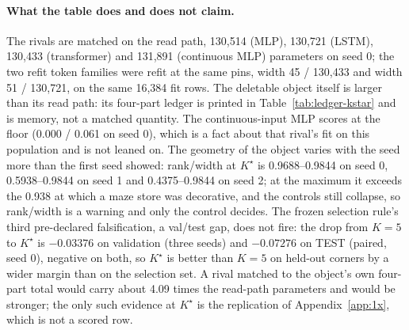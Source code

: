 \documentclass{article} %
\newcommand{\Kstar}{\ensuremath{K^{\star}}}
\begin{document}
\paragraph{What the table does and does not claim.} The rivals are matched on the read path,
130,514 (MLP), 130,721 (LSTM), 130,433 (transformer) and 131,891 (continuous MLP) parameters
on seed 0; the two refit token families were refit at the same pins, width 45 / 130,433 and
width 51 / 130,721, on the same 16,384 fit rows. %
The deletable object itself is larger than its read path: its four-part ledger is printed in
Table~\ref{tab:ledger-kstar} and is memory, not a matched quantity. The continuous-input MLP
scores at the floor (0.000 / 0.061 on seed 0), which is a fact about that rival's fit on this
population and is not leaned on. %
The geometry of the object varies with the seed more than the first seed showed:
rank/width at $\Kstar$ is 0.9688--0.9844 on seed 0, 0.5938--0.9844 on seed 1 and
0.4375--0.9844 on seed 2; at the maximum it exceeds the 0.938 at which a maze store was
decorative, and the controls still collapse, so rank/width is a warning and only the control
decides. %
The frozen selection rule's third pre-declared falsification, a val/test gap, does not fire:
the drop from $K=5$ to $\Kstar$ is $-0.03376$ on validation (three seeds) and $-0.07276$ on
TEST (paired, seed 0), negative on both, so $\Kstar$ is better than $K=5$ on held-out corners
by a wider margin than on the selection set. %
A rival matched to the object's own four-part total would carry about 4.09 times the
read-path parameters and would be stronger; the only such evidence at $\Kstar$ is the
replication of Appendix~\ref{app:1x}, which is not a scored row. %
\end{document}
